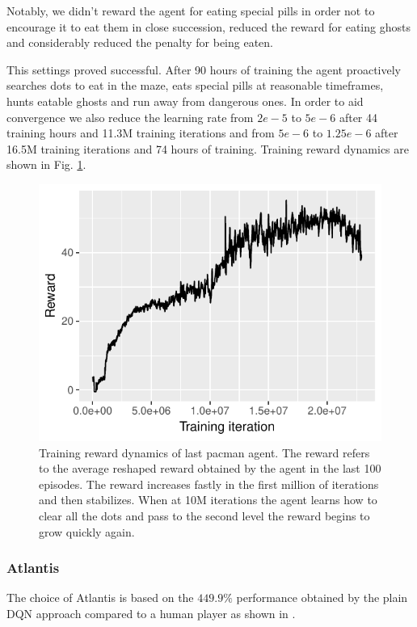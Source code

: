 \documentclass[10pt,twocolumn,letterpaper]{article}
\begin{document}
Notably, we didn't reward the agent for eating special pills in order not to encourage it to eat them in close succession, reduced the reward for eating ghosts and considerably reduced the penalty for being eaten.

This settings proved successful. After 90 hours of training the agent proactively searches dots to eat in the maze, eats special pills at reasonable timeframes, hunts eatable ghosts and run away from dangerous ones.
In order to aid convergence we also reduce the learning rate from $2e-5$ to $5e-6$ after 44 training hours and 11.3M training iterations and from $5e-6$ to $1.25e-6$ after 16.5M training iterations and 74 hours of training. Training reward dynamics are shown in Fig. \ref{fig:rewardPacmanFinal}.

\begin{figure}
	\includegraphics[width=\linewidth]{run_results/final_reward.pdf}
	\caption{Training reward dynamics of last pacman agent. The reward refers to the average reshaped reward obtained by the agent in the last 100 episodes. The reward increases fastly in the first million of iterations and then stabilizes. When at 10M iterations the agent learns how to clear all the dots and pass to the second level the reward begins to grow quickly again.}
	\label{fig:rewardPacmanFinal}
\end{figure}

\subsubsection{Atlantis}
\label{atlantis}
The choice of Atlantis is based on the $449.9\%$ performance obtained by the plain DQN approach compared to a human player as shown in \cite{humancontrol}.
 
\end{document}
